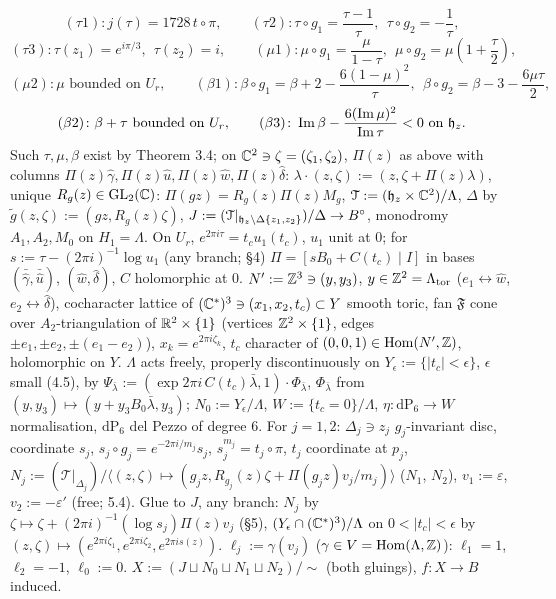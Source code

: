 \[
(\tau 1)\colon j(\tau) = 1728\, t\circ\pi, \qquad
(\tau 2)\colon \tau\circ g_1 = \frac{\tau - 1}{\tau}, \ \ \tau \circ g_2 = -\frac1\tau,
\]
\[
(\tau 3)\colon \tau(z_1) = e^{i\pi/3}, \ \ \tau(z_2) = i, \qquad
(\mu 1)\colon \mu\circ g_1 = \frac{\mu}{1-\tau}, \ \ \mu\circ g_2 = \mu\left(1 + \frac{\tau}{2}\right),
\]
\[
(\mu 2)\colon \mu \text{ bounded on } U_r, \qquad
(\beta 1)\colon \beta\circ g_1 = \beta + 2 - \frac{6(1-\mu)^2}{\tau}, \ \ \beta\circ g_2 = \beta - 3 - \frac{6\mu\tau}{2},
\]
\[
(\beta 2)\colon \beta + \tau \text{ bounded on } U_r, \qquad
(\beta 3)\colon \operatorname{Im}\beta - \frac{6(\operatorname{Im}\mu)^2}{\operatorname{Im}\tau} < 0 \text{ on } \mathfrak{h}_z.
\]
Such $\tau,\mu,\beta$ exist by Theorem 3.4; on $\mathbb{C}^2 \ni \zeta = (\zeta_1,\zeta_2)$, $\Pi(z)$ as above with columns $\Pi(z)\hat\gamma, \Pi(z)\hat u, \Pi(z)\hat w, \Pi(z)\hat\delta$: $\lambda\cdot(z,\zeta) := (z, \zeta + \Pi(z)\lambda)$, unique $R_g(z) \in \mathrm{GL}_2(\mathbb{C})$: $\Pi(gz) = R_g(z)\Pi(z)M_g$, $\mathcal T := (\mathfrak{h}_z \times \mathbb{C}^2)/\Lambda$, $\Delta$ by $\tilde g(z,\zeta) := (gz, R_g(z)\zeta)$, $J := (\mathcal T|_{\mathfrak{h}_z \setminus \Delta\{z_1,z_2\}})/\Delta \to B^\circ$, monodromy $A_1, A_2, M_0$ on $H_1 = \Lambda$. On $U_r$, $e^{2\pi i \tau} = t_c u_1(t_c)$, $u_1$ unit at $0$; for $s := \tau - (2\pi i)^{-1}\log u_1$ (any branch; \S4) $\Pi = [sB_0 + C(t_c) \mid I]$ in bases $(\bar{\hat\gamma},\bar{\hat u})$, $(\hat w,\hat\delta)$, $C$ holomorphic at $0$. $N' := \mathbb{Z}^3 \ni (y,y_3)$, $y \in \mathbb{Z}^2 = \Lambda_{\mathrm{tor}}$ ($e_1 \leftrightarrow \hat w$, $e_2 \leftrightarrow \hat\delta$), cocharacter lattice of $(\mathbb{C}^*)^3 \ni (x_1,x_2,t_c) \subset Y$ smooth toric, fan $\mathfrak F$ cone over $A_2$-triangulation of $\mathbb{R}^2 \times \{1\}$ (vertices $\mathbb{Z}^2 \times \{1\}$, edges $\pm e_1, \pm e_2, \pm(e_1 - e_2)$), $x_k = e^{2\pi i \zeta_k}$, $t_c$ character of $(0,0,1) \in \mathrm{Hom}(N',\mathbb{Z})$, holomorphic on $Y$. $\Lambda$ acts freely, properly discontinuously on $Y_\epsilon := \{|t_c| < \epsilon\}$, $\epsilon$ small (4.5), by $\Psi_{\bar\lambda} := (\exp 2\pi i\, C(t_c)\bar\lambda, 1)\cdot \Phi_{\bar\lambda}$, $\Phi_{\bar\lambda}$ from $(y,y_3) \mapsto (y + y_3 B_0\bar\lambda, y_3)$; $N_0 := Y_\epsilon/\Lambda$, $W := \{t_c = 0\}/\Lambda$, $\eta \colon \mathrm{dP}_6 \to W$ normalisation, $\mathrm{dP}_6$ del Pezzo of degree $6$. For $j=1,2$: $\Delta_j \ni z_j$ $g_j$-invariant disc, coordinate $s_j$, $s_j \circ g_j = e^{-2\pi i/m_j} s_j$, $s_j^{m_j} = t_j \circ \pi$, $t_j$ coordinate at $p_j$, $N_j := (\mathcal T|_{\Delta_j})/\langle (z,\zeta) \mapsto (g_j z, R_{g_j}(z)\zeta + \Pi(g_j z) v_j/m_j)\rangle$ ($N_1$, $N_2$), $v_1 := \varepsilon$, $v_2 := -\varepsilon'$ (free; 5.4). Glue to $J$, any branch: $N_j$ by $\zeta \mapsto \zeta + (2\pi i)^{-1}(\log s_j)\Pi(z)v_j$ (\S5), $(Y_\epsilon \cap (\mathbb{C}^*)^3)/\Lambda$ on $0 < |t_c| < \epsilon$ by $(z,\zeta) \mapsto (e^{2\pi i \zeta_1}, e^{2\pi i \zeta_2}, e^{2\pi i s(z)})$. $\ell_j := \gamma(v_j)$ ($\gamma \in V = \mathrm{Hom}(\Lambda,\mathbb{Z})$): $\ell_1 = 1$, $\ell_2 = -1$, $\ell_0 := 0$. $X := (J \sqcup N_0 \sqcup N_1 \sqcup N_2)/\!\sim$ (both gluings), $f \colon X \to B$ induced.

